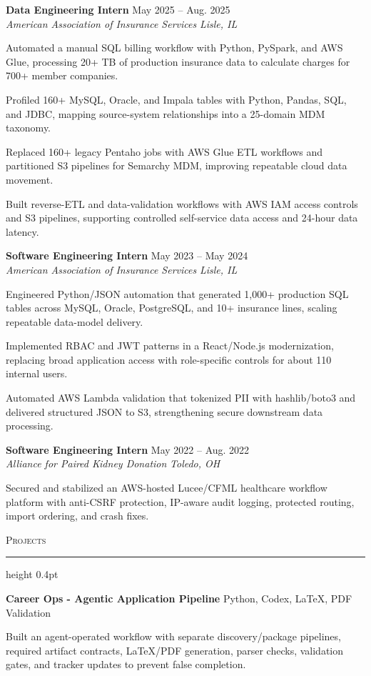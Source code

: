 \documentclass[letterpaper,11pt]{article}
\newcommand{\resumesection}[1]{%
  \par\vspace{2pt}%
  {\large\scshape #1}\par\vspace{2pt}%
  \hrule height 0.4pt\vspace{2pt}%
}
\newcommand{\resumeSubheading}[4]{
  \textbf{#1} \hfill #2\\
  \textit{#3} \hfill \textit{#4}
}
\newcommand{\projectHeading}[2]{
  \textbf{#1} \hfill #2
}
\begin{document}
\resumeSubheading
{Data Engineering Intern}{May 2025 -- Aug. 2025}
{American Association of Insurance Services}{Lisle, IL}
\begin{tightitemize}
  \item Automated a manual SQL billing workflow with Python, PySpark, and AWS Glue, processing 20+ TB of production insurance data to calculate charges for 700+ member companies.
  \item Profiled 160+ MySQL, Oracle, and Impala tables with Python, Pandas, SQL, and JDBC, mapping source-system relationships into a 25-domain MDM taxonomy.
  \item Replaced 160+ legacy Pentaho jobs with AWS Glue ETL workflows and partitioned S3 pipelines for Semarchy MDM, improving repeatable cloud data movement.
  \item Built reverse-ETL and data-validation workflows with AWS IAM access controls and S3 pipelines, supporting controlled self-service data access and 24-hour data latency.
\end{tightitemize}

\resumeSubheading
{Software Engineering Intern}{May 2023 -- May 2024}
{American Association of Insurance Services}{Lisle, IL}
\begin{tightitemize}
  \item Engineered Python/JSON automation that generated 1,000+ production SQL tables across MySQL, Oracle, PostgreSQL, and 10+ insurance lines, scaling repeatable data-model delivery.
  \item Implemented RBAC and JWT patterns in a React/Node.js modernization, replacing broad application access with role-specific controls for about 110 internal users.
  \item Automated AWS Lambda validation that tokenized PII with hashlib/boto3 and delivered structured JSON to S3, strengthening secure downstream data processing.
\end{tightitemize}

\resumeSubheading
{Software Engineering Intern}{May 2022 -- Aug. 2022}
{Alliance for Paired Kidney Donation}{Toledo, OH}
\begin{tightitemize}
  \item Secured and stabilized an AWS-hosted Lucee/CFML healthcare workflow platform with anti-CSRF protection, IP-aware audit logging, protected routing, import ordering, and crash fixes.
\end{tightitemize}

\resumesection{Projects}
\projectHeading{Career Ops - Agentic Application Pipeline}{Python, Codex, LaTeX, PDF Validation}
\begin{tightitemize}
  \item Built an agent-operated workflow with separate discovery/package pipelines, required artifact contracts, LaTeX/PDF generation, parser checks, validation gates, and tracker updates to prevent false completion.
\end{tightitemize}
\end{document}
